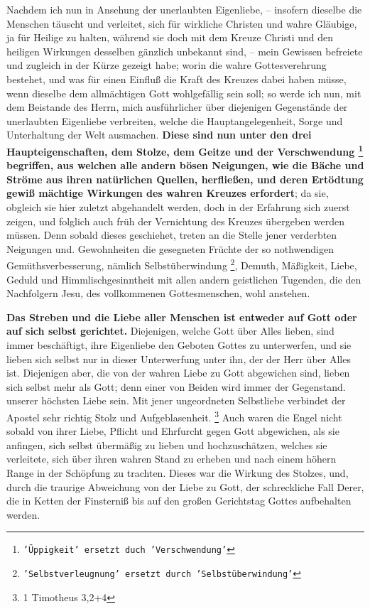 Nachdem ich nun in Ansehung der unerlaubten Eigenliebe, -- insofern dieselbe die
Menschen täuscht und verleitet, sich für wirkliche Christen und wahre Gläubige,
ja für Heilige zu halten, während sie doch mit dem Kreuze Christi und den
heiligen Wirkungen desselben gänzlich unbekannt sind, -- mein Gewissen befreiete
und zugleich in der Kürze gezeigt habe; worin die wahre Gottesverehrung
bestehet, und was für einen Einfluß die Kraft des Kreuzes dabei haben müsse,
wenn dieselbe dem allmächtigen Gott wohlgefällig sein soll; so werde ich nun,
mit dem Beistande des Herrn, mich ausführlicher über diejenigen Gegenstände der
unerlaubten Eigenliebe  verbreiten, welche die Hauptangelegenheit, Sorge und
Unterhaltung der Welt ausmachen. \textbf{Diese sind nun unter den drei
Haupteigenschaften, dem Stolze, dem Geitze und der Verschwendung
\footnote{\texttt{'Üppigkeit' ersetzt duch 'Verschwendung'}}  begriffen, aus
welchen alle andern bösen Neigungen, wie die Bäche und Ströme aus ihren
natürlichen Quellen, herfließen, und deren Ertödtung gewiß mächtige Wirkungen
des wahren Kreuzes erfordert}; da sie, obgleich sie hier zuletzt abgehandelt
werden, doch in der Erfahrung sich zuerst zeigen, und folglich auch früh der
Vernichtung des Kreuzes übergeben werden müssen. Denn sobald dieses geschiehet,
treten an die Stelle jener verderbten Neigungen und. Gewohnheiten die gesegneten
Früchte der so nothwendigen Gemüthsverbesserung, nämlich Selbstüberwindung \footnote{\texttt{'Selbstverleugnung' ersetzt durch 'Selbstüberwindung'}},
Demuth, Mäßigkeit, Liebe, Geduld und Himmlischgesinntheit mit allen andern
geistlichen Tugenden, die den Nachfolgern Jesu, des vollkommenen Gottesmenschen,
wohl anstehen.

\medskip

\textbf{Das Streben und die Liebe aller Menschen ist entweder auf Gott oder auf sich
selbst gerichtet.} Diejenigen, welche Gott über Alles lieben, sind immer
beschäftigt, ihre Eigenliebe den Geboten Gottes zu unterwerfen, und sie lieben
sich selbst nur in dieser Unterwerfung unter ihn, der der Herr über Alles ist.
Diejenigen aber, die von der wahren Liebe zu Gott abgewichen sind, lieben sich
selbst mehr als Gott; denn einer von Beiden wird immer der Gegenstand. unserer
höchsten Liebe sein. Mit jener ungeordneten Selbstliebe verbindet der Apostel
sehr richtig Stolz und Aufgeblasenheit.
\footnote{1 Timotheus 3,2+4}
Auch waren die
Engel nicht sobald von ihrer Liebe, Pflicht und Ehrfurcht gegen Gott abgewichen,
als sie anfingen, sich selbst übermäßig zu lieben und hochzuschätzen, welches
sie verleitete, sich über ihren wahren Stand zu erheben und nach einem höhern
Range in der Schöpfung zu trachten. Dieses war die Wirkung des Stolzes, und,
durch die traurige Abweichung von der Liebe zu Gott, der schreckliche Fall
Derer, die in Ketten der Finsterniß bis auf den großen Gerichtstag Gottes
aufbehalten werden.

